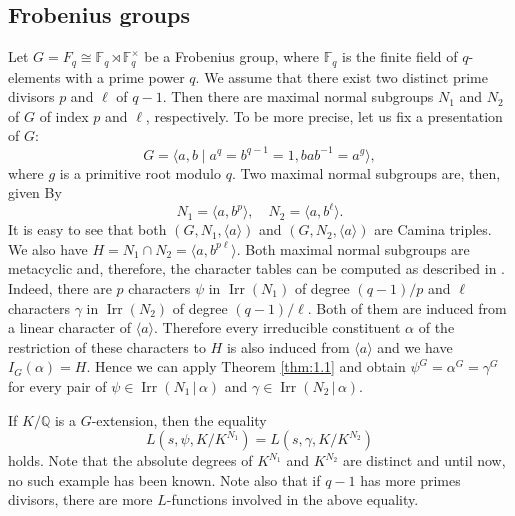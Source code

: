 \documentclass[a4paper,12pt]{article}
\newcommand{\field}[1]{\mathbb{#1}}
\newcommand{\Q}{\field{Q}}
\theoremstyle{definition}
\theoremstyle{remark}
\DeclareMathOperator{\irr}{Irr}
\numberwithin{equation}{section}
\begin{document}
\subsection{Frobenius groups} \label{sec:5.1}
Let $G=F_{q} \cong \mathbb{F}_q \rtimes  \mathbb{F}_q^{\times}$ be a Frobenius group, where 
$\mathbb{F}_q$ is the finite field of $q$-elements with a prime power $q$.
 We assume that there exist two distinct prime divisors $p$ and $\ell$
of $q-1$. Then there are maximal normal subgroups $N_1$ and $N_2$ of $G$ of index $p$ and $\ell$,
respectively.
To be more precise, let us fix a presentation of $G$:
\[
G=  \langle a,b \mid a^q = b^{q-1} =1,
bab^{-1} = a^g    \rangle,
\]
where $g$ is a primitive root modulo $q$.
Two maximal normal subgroups are, then, given By
\[
N_1=\langle a,b^p  \rangle , \quad N_2=\langle a,b^{\ell}  \rangle.
\]
It is easy to see that both 
$(G,N_1, \langle a \rangle )$ and $(G,N_2, \langle a \rangle )$ are Camina triples.
We also have $H=N_1 \cap N_2 = \langle a,b^{p\ell }  \rangle$.
Both maximal normal subgroups are metacyclic and, therefore, the character tables can be computed 
as described in \cite[Section 47]{MR0144979}.
Indeed, there are $p$ characters $\psi $ in $\irr (N_1)$ of degree $(q-1)/p$ and 
$\ell $ characters $\gamma$ in $\irr (N_2)$ of degree $(q-1)/\ell $. Both of them are induced from a 
linear character of $\langle a \rangle $. Therefore every irreducible constituent $\alpha$ of 
the restriction of these characters to $H$ is also induced from $\langle a \rangle$ and we have
$I_G (\alpha ) = H$. Hence we can apply Theorem \ref{thm:1.1} and obtain $\psi^G = \alpha^G=\gamma^G$ for 
every pair of 
$\psi \in \irr (N_1 \,|\, \alpha) $ and $\gamma \in \irr (N_2 \,|\, \alpha)$.

If $K/\Q$ is a $G$-extension, then the equality 
\[
L (s, \psi, K/K^{N_1}) = L (s, \gamma , K/K^{N_2})
\]
holds.
Note that the absolute degrees of $K^{N_1}$ and $K^{N_2}$ are distinct and until now, 
no such example has been known.
Note also 
that if $q-1$ has more primes divisors, there are more $L$-functions involved in the above equality.
\end{document}
